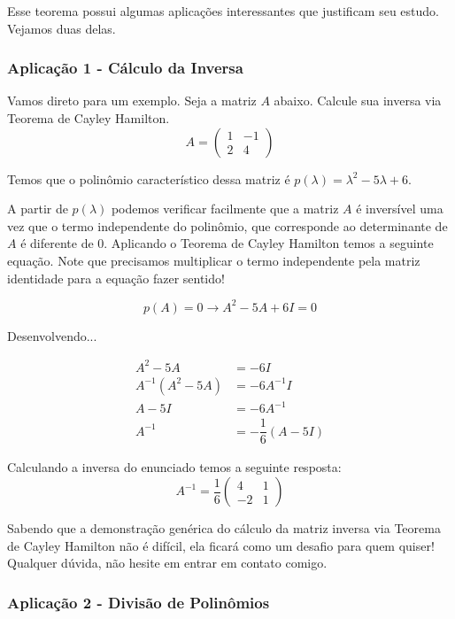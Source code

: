\documentclass[12pt]{article}
\begin{document}
Esse teorema possui algumas aplicações interessantes que justificam seu estudo. Vejamos duas delas.
\subsubsection{Aplicação 1 - Cálculo da Inversa}

Vamos direto para um exemplo. Seja a matriz $A$ abaixo. Calcule sua inversa via Teorema de Cayley Hamilton.
\begin{equation*}
	A=\begin{pmatrix}
		1&-1\\
		2&4
	\end{pmatrix}
\end{equation*}

Temos que o polinômio característico dessa matriz é $p(\lambda)=\lambda^2-5\lambda+6$.

A partir de $p(\lambda)$ podemos verificar facilmente que a matriz $A$ é inversível uma vez que o termo independente do polinômio, que corresponde ao determinante de $A$ é diferente de 0. Aplicando o Teorema de Cayley Hamilton temos a seguinte equação. Note que precisamos multiplicar o termo independente pela matriz identidade para a equação fazer sentido!

\begin{equation*}
	p(A)=0\rightarrow A^2-5A+6I=0
\end{equation*}

Desenvolvendo...

\begin{align*}
	A^2-5A&=-6I\\
	A^{-1}(A^2-5A)&=-6A^{-1}I\\
	A-5I&=-6A^{-1}\\
	A^{-1}&=-\dfrac{1}{6}(A-5I)
\end{align*}

Calculando a inversa do enunciado temos a seguinte resposta:
\begin{equation*}
	A^{-1}=\dfrac{1}{6}
	\begin{pmatrix}
		4&1\\
		-2&1
	\end{pmatrix}
\end{equation*}

Sabendo que a demonstração genérica do cálculo da matriz inversa via Teorema de Cayley Hamilton não é difícil, ela ficará como um desafio para quem quiser! Qualquer dúvida, não hesite em entrar em contato comigo.

\subsubsection{Aplicação 2 - Divisão de Polinômios}
\end{document}
